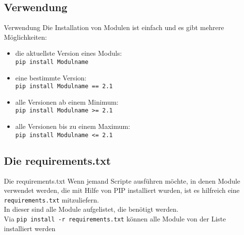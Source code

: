 \subsection{Verwendung}
\begin{frame}{Verwendung}
	Die Installation von Modulen ist einfach und es gibt mehrere M\"oglichkeiten:
	\begin{itemize}
		\item die aktuellste Version eines Moduls:\\
		\noindent\hspace*{.5cm} \texttt{pip install Modulname}
		\item eine bestimmte Version:\\
		\noindent\hspace*{.5cm} \texttt{pip install Modulname == 2.1}
		\item alle Versionen ab einem Minimum:\\
		\noindent\hspace*{.5cm} \texttt{pip install Modulname >= 2.1}
		\item alle Versionen bis zu einem Maximum:\\
		\noindent\hspace*{.5cm} \texttt{pip install Modulname <= 2.1}
	\end{itemize}
\end{frame}



\subsection{Die requirements.txt}
\begin{frame}{Die requirements.txt}
	Wenn jemand Scripte ausf\"uhren m\"ochte, in denen Module verwendet werden, die mit Hilfe von PIP installiert wurden, ist es hilfreich eine \alert{\texttt{requirements.txt}} mitzuliefern.\\
	In dieser sind alle Module aufgelistet, die ben\"otigt werden.\\[.5cm]
	

	Via \alert{\texttt{pip install -r requirements.txt}} k\"onnen alle Module von der Liste installiert werden
\end{frame}


